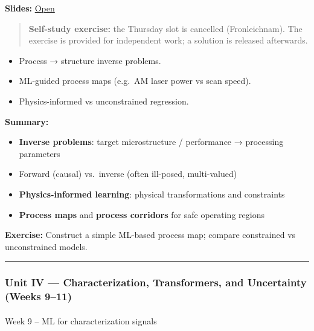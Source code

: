 \documentclass[
]{agujournal2019}
\makeatletter
\let\oldparagraph\paragraph
\renewcommand{\paragraph}{
    \@ifstar
      \xxxParagraphStar
      \xxxParagraphNoStar
  }
\newcommand{\xxxParagraphStar}[1]{\oldparagraph*{#1}\mbox{}}
\newcommand{\xxxParagraphNoStar}[1]{\oldparagraph{#1}\mbox{}}
\providecommand{\tightlist}{%
  \setlength{\itemsep}{0pt}\setlength{\parskip}{0pt}}
\makeatother
\begin{document}
\textbf{Slides:}
\href{https://pelzlab.science/public_presentations/ml_for_characterization_and_processing/unit08_inverse_problems/09_inverse_problems.html}{Open}

\begin{quote}
\textbf{Self-study exercise:} the Thursday slot is cancelled
(Fronleichnam). The exercise is provided for independent work; a
solution is released afterwards.
\end{quote}

\begin{itemize}
\tightlist
\item
  Process → structure inverse problems.
\item
  ML-guided process maps (e.g.~AM laser power vs scan speed).
\item
  Physics-informed vs unconstrained regression.
\end{itemize}

\textbf{Summary:}

\begin{itemize}
\tightlist
\item
  \textbf{Inverse problems}: target microstructure / performance →
  processing parameters
\item
  Forward (causal) vs.~inverse (often ill-posed, multi-valued)
\item
  \textbf{Physics-informed learning}: physical transformations and
  constraints
\item
  \textbf{Process maps} and \textbf{process corridors} for safe
  operating regions
\end{itemize}

\textbf{Exercise:} Construct a simple ML-based process map; compare
constrained vs unconstrained models.

\begin{center}\rule{0.5\linewidth}{0.5pt}\end{center}

\subsubsection{Unit IV --- Characterization, Transformers, and
Uncertainty (Weeks
9--11)}\label{unit-iv-characterization-transformers-and-uncertainty-weeks-911}

\paragraph{Week 9 -- ML for characterization
signals}\label{week-9-ml-for-characterization-signals}
\end{document}
